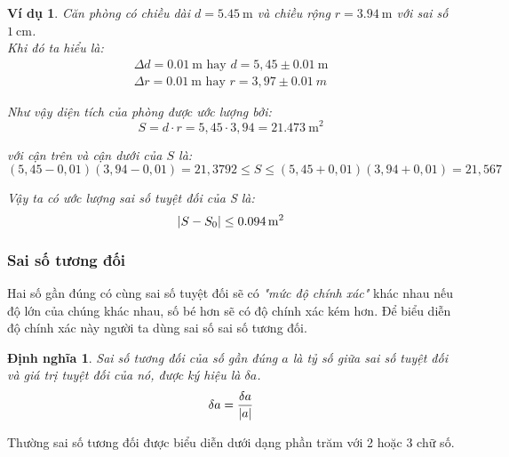 \documentclass{article}    %
\DeclarePairedDelimiter\abs{\lvert}{\rvert}%
\newtheorem{definition}{Định nghĩa}[section]
\newtheorem{exmp}{Ví dụ}
\begin{document}
\begin{exmp}
    Căn phòng có chiều dài \(d = \SI{5,45}{\m}\) và chiều rộng \(r =
    \SI{3,94}{\m}\) với sai số \(\SI{1}{\cm}\).\\

    Khi đó ta hiểu là:
    \begin{gather*}
        \Delta d = \SI{0,01}{\m} \textrm{ hay } d = 5,45 \pm \SI{0,01}{\m}\\
        \Delta r = \SI{0,01}{\m} \textrm{ hay } r = 3,97 \pm \SI{0.01}{m}
    \end{gather*}

    Như vậy diện tích của phòng được ước lượng bởi:
    \begin{equation*}
        S = d \cdot r = 5,45 \cdot 3,94 = \SI{21,473}{\meter\squared}
    \end{equation*}

    với cận trên và cận dưới của \(S\) là:
    \begin{equation*}
        (5,45 - 0,01)(3,94 - 0,01) = 21,3792 \leq S \leq (5,45 + 0,01)(3,94 + 0,01) = 21,567
    \end{equation*}

    Vậy ta có ước lượng sai số tuyệt đối của S là:
    \begin{equation*}
        \abs{S - S_0} \leq \SI{0,094}{\meter\squared}
    \end{equation*}
\end{exmp}

\subsubsection{Sai số tương đối}

Hai số gần đúng có cùng sai số tuyệt đối sẽ có \emph{"mức độ chính xác"} khác
nhau nếu độ lớn của chúng khác nhau, số bé hơn sẽ có độ chính xác kém hơn. Để
biểu diễn độ chính xác này người ta dùng sai số sai số tương đối.

\begin{definition}
    \emph{Sai số tương đối} của số gần đúng \(a\) là tỷ số giữa sai số tuyệt đối
    và giá trị tuyệt đối của nó, được ký hiệu là \(\delta a\).
    \begin{equation} \label{eq:4}
        \delta a = \frac{\delta a}{\abs{a}}
    \end{equation}
\end{definition}

Thường sai số tương đối được biểu diễn dưới dạng phần trăm với 2 hoặc 3 chữ số.
\end{document}
